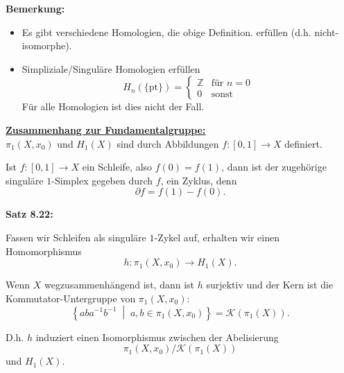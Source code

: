 \documentclass[fleqn, 12pt, letterpaper]{article}
\begin{document}
\textbf{Bemerkung:}
\begin{itemize}
    \item Es gibt verschiedene Homologien, die obige Definition. erfüllen (d.h. nicht-isomorphe).
    \item Simpliziale/Singuläre Homologien erfüllen
    \[
    H_n(\{\text{pt}\}) =
    \begin{cases}
        \mathbb{Z} & \text{für } n = 0 \\
        0 & \text{sonst}
    \end{cases}
    \]
    Für alle Homologien ist dies nicht der Fall.
\end{itemize}

\vspace{1cm}

\textbf{\underline{Zusammenhang zur Fundamentalgruppe:}}\\

$\pi_1(X,x_0)$ und $H_1(X)$ sind durch Abbildungen $f : [0,1] \to X$ definiert.

Ist $f : [0,1] \to X$ ein Schleife, also $f(0) = f(1)$, dann ist der zugehörige singuläre $1$-Simplex gegeben durch $f$, ein Zyklus, denn
\[
\partial f = f(1) - f(0) .
\]

\textbf{Satz 8.22:} 

Fassen wir Schleifen als singuläre $1$-Zykel auf, erhalten wir einen Homomorphismus
\[
h : \pi_1(X,x_0) \to H_1(X).
\]

Wenn $X$ wegzusammenhängend ist, dann ist $h$ surjektiv und der Kern ist die Kommutator-Untergruppe von $\pi_1(X,x_0)$:
\[
\left\{ a b a^{-1} b^{-1} \;\middle|\; a,b \in \pi_1(X,x_0) \right\} = \mathcal{K}(\pi_1(X)).
\]

D.h. $h$ induziert einen Isomorphismus zwischen der Abelisierung
\[
\pi_1(X,x_0)/\mathcal{K}(\pi_1(X))
\]
und $H_1(X)$.
\end{document}
